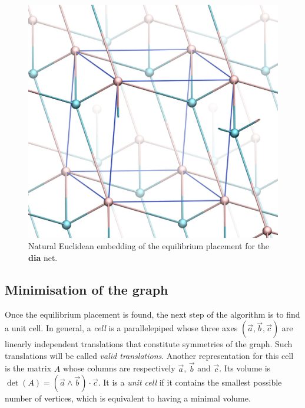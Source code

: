 \documentclass[main.tex]{subfiles}
\begin{document}
\begin{figure}[ht]
	\centering
	\includegraphics[width=0.4\linewidth]{figures/topology/dia.jpg}
	\caption{Natural Euclidean embedding of the equilibrium placement for the {\bf dia} net.}
	\label{diavmd}
\end{figure}



\subsection{Minimisation of the graph}

\label{minimisation}

Once the equilibrium placement is found, the next step of the algorithm is to find a unit cell. In general, a \emph{cell} is a parallelepiped whose three axes $(\vec a, \vec b, \vec c)$ are linearly independent translations that constitute symmetries of the graph. Such translations will be called \emph{valid translations}. Another representation for this cell is the matrix $A$ whose columns are respectively $\vec a$, $\vec b$ and $\vec c$. Its volume is $\det(A) = (\vec a\wedge\vec b)\cdot\vec c$. It is a \emph{unit cell} if it contains the smallest possible number of vertices, which is equivalent to having a minimal volume. %
\end{document}
